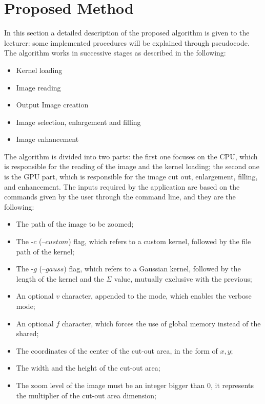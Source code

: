 \section{Proposed Method}

In this section a detailed description of the proposed algorithm is given to the lecturer: 
some implemented procedures will be explained through pseudocode. 
The algorithm works in successive stages as described in the following:

\begin{itemize}
    \item Kernel loading
    \item Image reading
    \item Output Image creation
    \item Image selection, enlargement and filling
    \item Image enhancement
\end{itemize}

The algorithm is divided into two parts: the first one focuses on the CPU, which is responsible for the reading of the image
and the kernel loading; the second one is the GPU part, which is responsible for the image cut out, enlargement, filling, and enhancement.
The inputs required by the application are based on the commands given by the user through the command line, and they are the following:
\begin{itemize}
    \item The path of the image to be zoomed;
    \item The -$c$ (--$custom$) flag, which refers to a custom kernel, followed by the file path of the kernel;
    \item The -$g$ (--$gauss$) flag, which refers to a Gaussian kernel, followed by the length of the kernel and the $\Sigma$ value, mutually exclusive with the previous;
    \item An optional $v$ character, appended to the mode, which enables the verbose mode;
    \item An optional $f$ character, which forces the use of global memory instead of the shared;
    \item The coordinates of the center of the cut-out area, in the form of $x,y$;
    \item The width and the height of the cut-out area;
    \item The zoom level of the image must be an integer bigger than 0, it represents the multiplier of the cut-out area dimension;
\end{itemize}

